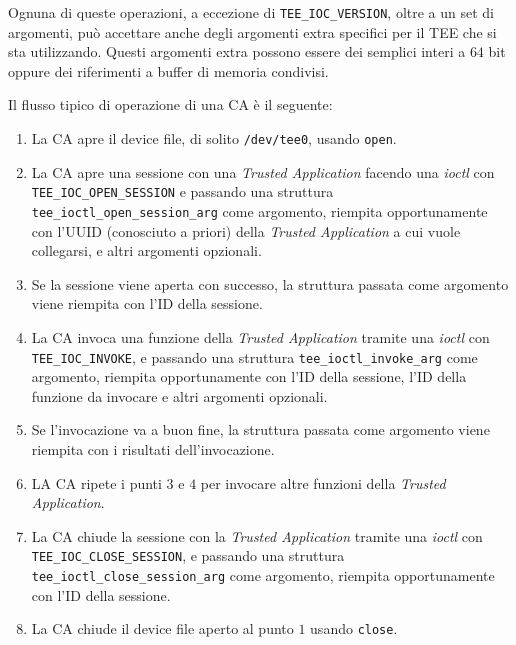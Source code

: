 \documentclass[12pt,italian]{report}
\begin{document}
Ognuna di queste operazioni, a eccezione di \texttt{TEE\_IOC\_VERSION},
oltre a un set di argomenti, può accettare anche degli argomenti extra
specifici per il TEE che si sta utilizzando.
Questi argomenti extra possono essere dei semplici interi a $64$ bit oppure
dei riferimenti a buffer di memoria condivisi.

Il flusso tipico di operazione di una CA è il seguente:
\begin{enumerate}
    \item La CA apre il device file, di solito \texttt{/dev/tee0}, usando
        \texttt{open}.
    \item La CA apre una sessione con una \textit{Trusted Application}
        facendo una \textit{ioctl} con \texttt{TEE\_IOC\_OPEN\_SESSION}
        e passando una struttura \\
        \texttt{tee\_ioctl\_open\_session\_arg}
        come argomento, riempita opportunamente con l'UUID
        (conosciuto a priori) 
        della \textit{Trusted Application} a cui vuole collegarsi, 
        e altri argomenti opzionali.
    \item Se la sessione viene aperta con successo, la struttura passata come
        argomento viene riempita con l'ID della sessione.
    \item La CA invoca una funzione della \textit{Trusted Application} tramite
        una \textit{ioctl} con \texttt{TEE\_IOC\_INVOKE}, e passando una
        struttura \texttt{tee\_ioctl\_invoke\_arg} come argomento, riempita
        opportunamente con l'ID della sessione, l'ID della funzione da
        invocare e altri argomenti opzionali.
    \item Se l'invocazione va a buon fine, la struttura passata come argomento
        viene riempita con i risultati dell'invocazione.
    \item LA CA ripete i punti $3$ e $4$ per invocare altre funzioni della
        \textit{Trusted Application}.
    \item La CA chiude la sessione con la \textit{Trusted Application} tramite
        una \textit{ioctl} con \texttt{TEE\_IOC\_CLOSE\_SESSION}, e passando
        una struttura \\
        \texttt{tee\_ioctl\_close\_session\_arg} come argomento,
        riempita opportunamente con l'ID della sessione.
    \item La CA chiude il device file aperto al punto $1$ usando \texttt{close}.
\end{enumerate}

\bigbreak \noindent
\end{document}
